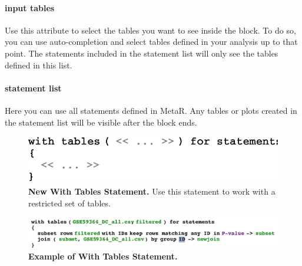 \paragraph{input tables}
Use this attribute to select the tables you want to see inside the block. To do so, you can use auto-completion and select tables defined in your analysis up to that point. The statements included in the statement list will only see the tables defined in this list. 

\paragraph{statement list}
Here you can use all statements defined in MetaR. Any tables or plots created in the statement list will be visible after the block ends.
 
\begin{figure}[h!tbp]
  \centering
  \includegraphics[width=\figWidthNarrow]{figures/NewWithTablesStatement.pdf}
\caption[New With Tables Statement.]{\textbf{New With Tables Statement.} Use this statement to work with a restricted set of tables.}
\label{fig:NewWithTablesStatement}
\end{figure}

 \begin{figure}[h!tbp]
  \centering
  \includegraphics[width=\figWidthWide]{figures/ExampleWithTablesStatement.pdf}
\caption[Example of With Tables Statement.]{\textbf{Example of With Tables Statement.}}
\label{fig:ExampleWithTablesStatement}
\end{figure}

